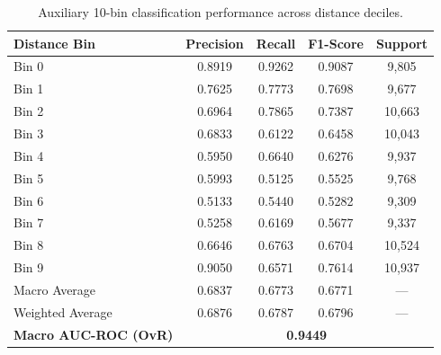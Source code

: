 \begin{table}[H]
\centering
\small
\begin{tabular}{lcccc}
\toprule
\textbf{Distance Bin} & \textbf{Precision} & \textbf{Recall} & \textbf{F1-Score} & \textbf{Support} \\
\midrule
Bin 0 & 0.8919 & 0.9262 & 0.9087 & 9,805 \\
Bin 1 & 0.7625 & 0.7773 & 0.7698 & 9,677 \\
Bin 2 & 0.6964 & 0.7865 & 0.7387 & 10,663 \\
Bin 3 & 0.6833 & 0.6122 & 0.6458 & 10,043 \\
Bin 4 & 0.5950 & 0.6640 & 0.6276 & 9,937 \\
Bin 5 & 0.5993 & 0.5125 & 0.5525 & 9,768 \\
Bin 6 & 0.5133 & 0.5440 & 0.5282 & 9,309 \\
Bin 7 & 0.5258 & 0.6169 & 0.5677 & 9,337 \\
Bin 8 & 0.6646 & 0.6763 & 0.6704 & 10,524 \\
Bin 9 & 0.9050 & 0.6571 & 0.7614 & 10,937 \\
\midrule
Macro Average & 0.6837 & 0.6773 & 0.6771 & --- \\
Weighted Average & 0.6876 & 0.6787 & 0.6796 & --- \\
\textbf{Macro AUC-ROC (OvR)} & \multicolumn{4}{c}{\textbf{0.9449}} \\
\bottomrule
\end{tabular}
\caption{Auxiliary 10-bin classification performance across distance deciles.}
\label{tab:classification_results}
\end{table}
